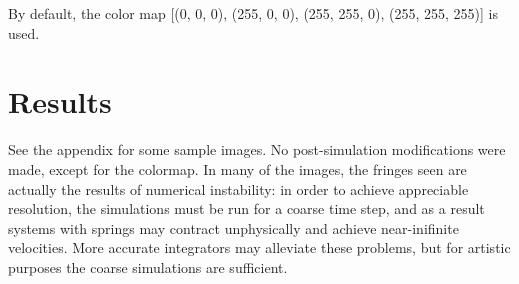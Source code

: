 \documentclass{article}
\newcommand{\floor}[1]{\ensuremath{\left\lfloor #1 \right\rfloor}}
\newcommand{\abs}[1]{\ensuremath{\left| #1 \right|}}
\begin{document}
By default, the color map [(0, 0, 0), (255, 0, 0), (255, 255, 0), (255, 255, 255)] is used. 






\section{Results}
See the appendix for some sample images. No post-simulation modifications were made, except for the colormap. In many of the images, the fringes seen are actually the results of numerical instability: in order to achieve appreciable resolution, the simulations must be run for a coarse time step, and as a result systems with springs may contract unphysically and achieve near-inifinite velocities. More accurate integrators may alleviate these problems, but for artistic purposes the coarse simulations are sufficient. 
\end{document}
